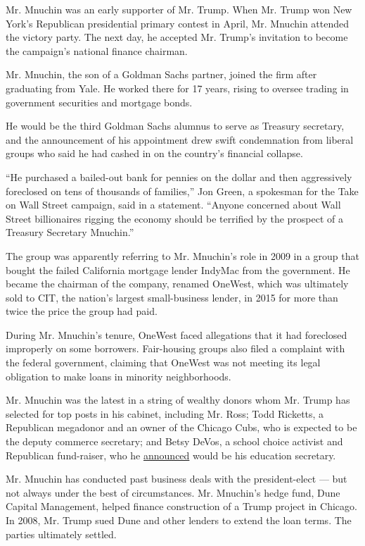 Mr. Mnuchin was an early supporter of Mr. Trump. When Mr. Trump won New
York's Republican presidential primary contest in April, Mr. Mnuchin
attended the victory party. The next day, he accepted Mr. Trump's
invitation to become the campaign's national finance chairman.

Mr. Mnuchin, the son of a Goldman Sachs partner, joined the firm after
graduating from Yale. He worked there for 17 years, rising to oversee
trading in government securities and mortgage bonds.

He would be the third Goldman Sachs alumnus to serve as Treasury
secretary, and the announcement of his appointment drew swift
condemnation from liberal groups who said he had cashed in on the
country's financial collapse.

``He purchased a bailed-out bank for pennies on the dollar and then
aggressively foreclosed on tens of thousands of families,'' Jon Green, a
spokesman for the Take on Wall Street campaign, said in a statement.
``Anyone concerned about Wall Street billionaires rigging the economy
should be terrified by the prospect of a Treasury Secretary Mnuchin.''

The group was apparently referring to Mr. Mnuchin's role in 2009 in a
group that bought the failed California mortgage lender IndyMac from the
government. He became the chairman of the company, renamed OneWest,
which was ultimately sold to CIT, the nation's largest small-business
lender, in 2015 for more than twice the price the group had paid.

During Mr. Mnuchin's tenure, OneWest faced allegations that it had
foreclosed improperly on some borrowers. Fair-housing groups also filed
a complaint with the federal government, claiming that OneWest was not
meeting its legal obligation to make loans in minority neighborhoods.

Mr. Mnuchin was the latest in a string of wealthy donors whom Mr. Trump
has selected for top posts in his cabinet, including Mr. Ross; Todd
Ricketts, a Republican megadonor and an owner of the Chicago Cubs, who
is expected to be the deputy commerce secretary; and Betsy DeVos, a
school choice activist and Republican fund-raiser, who he
\href{https://www.nytimes.com/2016/11/23/us/politics/donald-trump-president-elect.html}{announced}
would be his education secretary.

Mr. Mnuchin has conducted past business deals with the president-elect
--- but not always under the best of circumstances. Mr. Mnuchin's hedge
fund, Dune Capital Management, helped finance construction of a Trump
project in Chicago. In 2008, Mr. Trump sued Dune and other lenders to
extend the loan terms. The parties ultimately settled.


